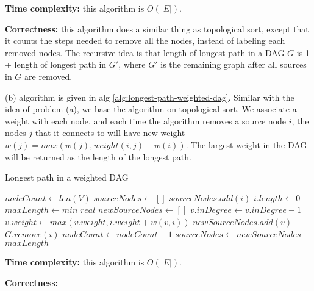 \documentclass{article}
\begin{document}
\begin{description}
  \textbf{Time complexity:} this algorithm is $O(|E|)$.

  \textbf{Correctness:} this algorithm does a similar thing as topological sort, except that it counts the steps needed to remove all the nodes, instead of labeling each removed nodes. The recursive idea is that length of longest path in a DAG $G$ is 1 + length of longest path in $G'$, where $G'$ is the remaining graph after all sources in $G$ are removed.

  (b) algorithm is given in alg \ref{alg:longest-path-weighted-dag}. Similar with the idea of problem (a), we base the algorithm on topological sort. We associate a weight with each node, and each time the algorithm removes a source node $i$, the nodes $j$ that it connects to will have new weight $w(j) = max(w(j), weight(i,j) + w(i))$. The largest weight in the DAG will be returned as the length of the longest path.

  \begin{algorithm}[h]
  \caption{Longest path in a weighted DAG}
  \label{alg:longest-path-weighted-DAG}
    \begin{algorithmic}[1]
  
      \State $nodeCount \gets len(V)$
      \State $sourceNodes \gets []$
          \State $sourceNodes.add(i)$
          \State $i.length \gets 0$
        \EndIf
      \EndFor
      \State $maxLength \gets min\_real$
        \State $newSourceNodes \gets []$
            \State $v.inDegree \gets v.inDegree - 1$
            \State $v.weight \gets max(v.weight, i.weight + w(v,i))$
            \EndIf
              \State $newSourceNodes.add(v)$
            \EndIf
          \EndFor
          \State $G.remove(i)$
          \State $nodeCount \gets nodeCount - 1$
        \EndFor
        \State $sourceNodes \gets newSourceNodes$
      \EndWhile
      \State \Return $maxLength$
    \EndFunction
    
    \end{algorithmic}
  \end{algorithm}

  \textbf{Time complexity:} this algorithm is $O(|E|)$.

  \textbf{Correctness:} 


\end{description}
\end{document}
